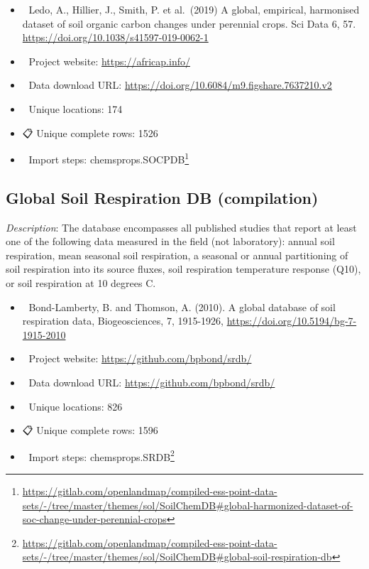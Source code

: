 \documentclass[
  graybox,natbib,nospthms]{svmono}
\providecommand{\tightlist}{%
  \setlength{\itemsep}{0pt}\setlength{\parskip}{0pt}}
\providecommand{\tightlist}{\setlength{\itemsep}{0pt}\setlength{\parskip}{0pt}}
\renewcommand{\href}[2]{#2 (\url{#1})}
\renewcommand{\href}[2]{#2\footnote{\url{#1}}}
\begin{document}
\begin{itemize}
\tightlist
\item
  📕 Ledo, A., Hillier, J., Smith, P. et al.~(2019) A global, empirical, harmonised dataset of soil organic carbon changes under perennial crops. Sci Data 6, 57. \url{https://doi.org/10.1038/s41597-019-0062-1}\\
\item
  🔗 Project website: \url{https://africap.info/}\\
\item
  📂 Data download URL: \url{https://doi.org/10.6084/m9.figshare.7637210.v2}\\
\item
  📍 Unique locations: 174\\
\item
  📋 Unique complete rows: 1526\\
\item
  📝 Import steps: \href{https://gitlab.com/openlandmap/compiled-ess-point-data-sets/-/tree/master/themes/sol/SoilChemDB\#global-harmonized-dataset-of-soc-change-under-perennial-crops}{chemsprops.SOCPDB}
\end{itemize}

\hypertarget{global-soil-respiration-db-compilation}{%
\subsection{Global Soil Respiration DB (compilation)}\label{global-soil-respiration-db-compilation}}

\emph{Description}: The database encompasses all published studies that report at least one of the following data measured in the field (not laboratory): annual soil respiration, mean seasonal soil respiration, a seasonal or annual partitioning of soil respiration into its source fluxes, soil respiration temperature response (Q10), or soil respiration at 10 degrees C.

\begin{itemize}
\tightlist
\item
  📕 Bond-Lamberty, B. and Thomson, A. (2010). A global database of soil respiration data, Biogeosciences, 7, 1915-1926, \url{https://doi.org/10.5194/bg-7-1915-2010}\\
\item
  🔗 Project website: \url{https://github.com/bpbond/srdb/}\\
\item
  📂 Data download URL: \url{https://github.com/bpbond/srdb/}\\
\item
  📍 Unique locations: 826\\
\item
  📋 Unique complete rows: 1596\\
\item
  📝 Import steps: \href{https://gitlab.com/openlandmap/compiled-ess-point-data-sets/-/tree/master/themes/sol/SoilChemDB\#global-soil-respiration-db}{chemsprops.SRDB}
\end{itemize}
\end{document}
